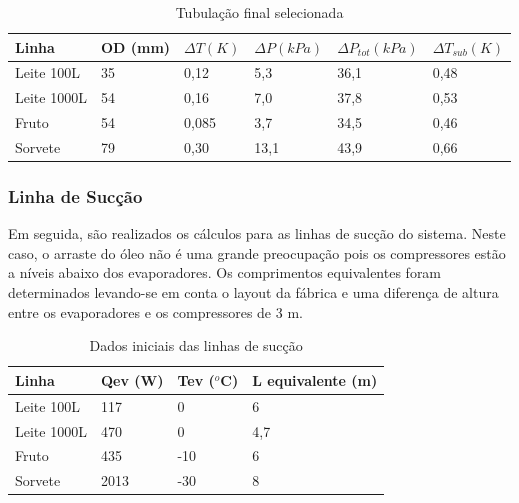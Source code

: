 \documentclass[10pt,a4paper]{article}
\begin{document}
\begin{table}[h]
\centering
\caption{Tubulação final selecionada}
\begin{tabular}{|l|l|l|l|l|l|}
\hline
Linha & OD (mm) & $\Delta T (K)$ & $\Delta P (kPa)$ & $\Delta P_{tot} (kPa)$ & $\Delta T_{sub} (K)$ \\ \hline
Leite 100L     & 35      & 0,12                        & 5,3                           & 36,1                                   & 0,48                                 \\ \hline
Leite 1000L     & 54      & 0,16                        & 7,0                           & 37,8                                   & 0,53                                 \\ \hline
Fruto     & 54      & 0,085                       & 3,7                           & 34,5                                   & 0,46                                 \\ \hline
Sorvete     & 79      & 0,30                        & 13,1                          & 43,9                                   & 0,66                                 \\ \hline
\end{tabular}
\label{tubosliquido}
\end{table}

\subsubsection{{Linha de Sucção}}

Em seguida, são realizados os cálculos para as linhas de sucção do sistema. Neste caso, o arraste do óleo não é uma grande preocupação pois os compressores estão a níveis abaixo dos evaporadores. Os comprimentos equivalentes foram determinados levando-se em conta o layout da fábrica e uma diferença de altura entre os evaporadores e os compressores de 3 m.

\begin{table}[h!]
    \centering
    \caption{Dados iniciais das linhas de sucção}
    \begin{tabular}{|l|l|l|l|}
    \hline
Linha & Qev (W) & Tev ($^o$C) & L equivalente (m) \\ \hline
Leite 100L     & 117    & 0 & 6              \\ \hline
Leite 1000L     & 470   & 0  & 4,7             \\ \hline
Fruto     & 435     & -10 & 6               \\ \hline
Sorvete     & 2013    & -30 & 8               \\ \hline
    \end{tabular}
    \label{tabsuc}
\end{table}
\end{document}
